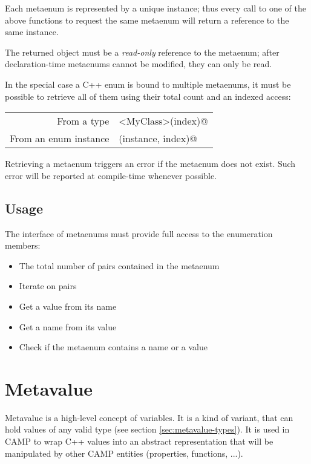 \documentclass[a4paper, twoside]{report}
\begin{document}
	Each metaenum is represented by a unique instance; thus every call to one of the above functions
	to request the same metaenum will return a reference to the same instance.
	
	The returned object must be a \emph{read-only} reference to the metaenum; after declaration-time
	metaenums cannot be modified, they can only be read.

	In the special case a C++ enum is bound to multiple metaenums, it must be possible to
	retrieve all of them using their total count and an indexed access:

	\begin{tabular}{r|l}
		From a type 				  & \verb@enumByType<MyClass>(index)@    \\
		From an enum instance & \verb@enumByObject(instance, index)@
	\end{tabular}
	
	Retrieving a metaenum triggers an error if the metaenum does not exist. Such error will be reported
	at compile-time whenever possible.

\subsection{Usage}

	The interface of metaenums must provide full access to the enumeration members:
	
	\begin{itemize}
		\item The total number of pairs contained in the metaenum
		\item Iterate on pairs
		\item Get a value from its name
		\item Get a name from its value
		\item Check if the metaenum contains a name or a value
	\end{itemize}

\section{Metavalue}
\label{sec:metavalue}

	Metavalue is a high-level concept of variables. It is a kind of variant, that can hold values of
	any valid type (see section \ref{sec:metavalue-types}). It is used in CAMP to wrap C++ values
	into an abstract representation that will be manipulated by other CAMP entities (properties, functions, ...).
	
\end{document}
